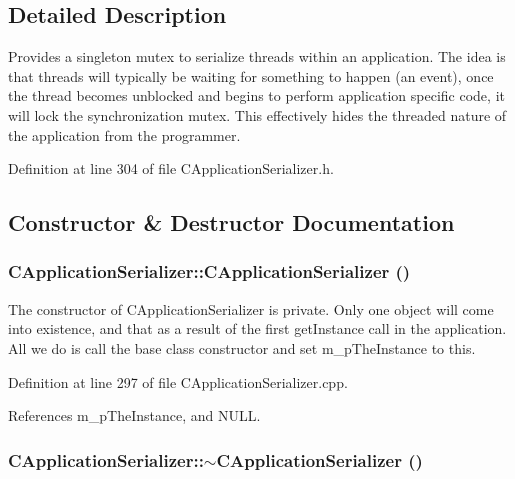 \subsection{Detailed Description}
Provides a singleton mutex to serialize threads within an application. The idea is that threads will typically be waiting for something to happen (an event), once the thread becomes unblocked and begins to perform application specific code, it will lock the synchronization mutex. This effectively hides the threaded nature of the application from the programmer. 



Definition at line 304 of file CApplication\-Serializer.h.

\subsection{Constructor \& Destructor Documentation}
\subsubsection{\setlength{\rightskip}{0pt plus 5cm}CApplication\-Serializer::CApplication\-Serializer ()\hspace{0.3cm}{\tt  [private]}}\label{classCApplicationSerializer_c0}


The constructor of CApplication\-Serializer is private. Only one object will come into existence, and that as a result of the first  get\-Instance call in the application. All we do is call the base class constructor and set m\_\-p\-The\-Instance to this. 

Definition at line 297 of file CApplication\-Serializer.cpp.

References m\_\-p\-The\-Instance, and NULL.
\subsubsection{\setlength{\rightskip}{0pt plus 5cm}CApplication\-Serializer::$\sim$CApplication\-Serializer ()\hspace{0.3cm}{\tt  [private]}}\label{classCApplicationSerializer_c1}


